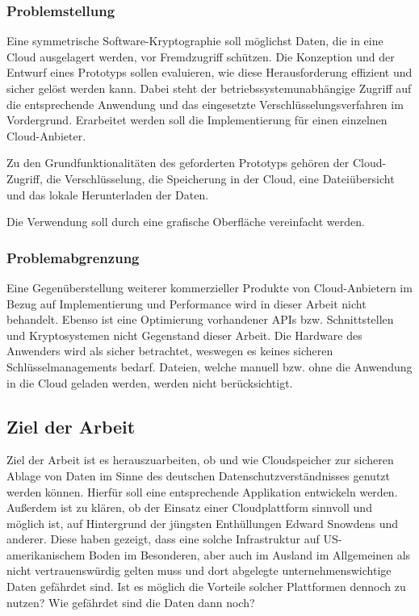 \documentclass[12pt,a4paper,bibliography=totocnumbered,listof=totocnumbered]{scrartcl}
\begin{document}
\subsubsection{Problemstellung}
Eine symmetrische Software-Kryptographie soll möglichst Daten, die in eine Cloud ausgelagert werden,  vor Fremdzugriff schützen. Die Konzeption und der Entwurf eines Prototyps sollen evaluieren, wie diese Herausforderung effizient und sicher gelöst werden kann. Dabei steht der betriebssystemunabhängige Zugriff auf die entsprechende Anwendung und das eingesetzte Verschlüsselungsverfahren im Vordergrund. Erarbeitet werden soll die Implementierung für einen einzelnen Cloud-Anbieter. 

Zu den Grundfunktionalitäten des geforderten Prototyps gehören der Cloud-Zugriff, die Verschlüsselung, die Speicherung in der Cloud, eine Dateiübersicht und das lokale Herunterladen der Daten.

Die Verwendung soll durch eine grafische Oberfläche vereinfacht werden.

\subsubsection{Problemabgrenzung}
Eine Gegenüberstellung weiterer kommerzieller Produkte von Cloud-Anbietern im Bezug auf Implementierung und Performance wird in dieser Arbeit nicht behandelt. Ebenso ist eine Optimierung vorhandener APIs bzw. Schnittstellen und Kryptosystemen nicht Gegenstand dieser Arbeit. Die Hardware des Anwenders wird als sicher betrachtet, weswegen es keines sicheren Schlüsselmanagements bedarf. Dateien, welche manuell bzw. ohne die Anwendung in die Cloud geladen werden, werden nicht berücksichtigt.

\subsection{Ziel der Arbeit}
Ziel der Arbeit ist es herauszuarbeiten, ob und wie Cloudspeicher zur sicheren Ablage von Daten im Sinne des deutschen Datenschutzverständnisses genutzt werden können. Hierfür soll eine entsprechende Applikation entwickeln werden. Außerdem ist zu klären, ob der Einsatz einer Cloudplattform sinnvoll und möglich ist, auf Hintergrund der jüngsten Enthüllungen Edward Snowdens und anderer. Diese haben gezeigt, dass eine solche Infrastruktur auf US-amerikanischem Boden im Besonderen, aber auch im Ausland im Allgemeinen als nicht vertrauenswürdig gelten muss und dort abgelegte unternehmenswichtige Daten gefährdet sind. Ist es möglich die Vorteile solcher Plattformen dennoch zu nutzen? Wie gefährdet sind die Daten dann noch?
\end{document}
